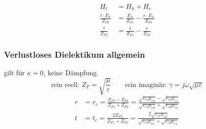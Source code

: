 %

\begin{align*}
    H_t                         & = H_h + H_r                                          \\
    \frac{t\cdot E_{h}}{Z_{F2}} & = \frac{E_{h}}{Z_{F1}} - \frac{r\cdot E_{h}}{Z_{F1}} \\
    \frac{t}{Z_{F2}}            & = \frac{1}{Z_{F1}} - \frac{r}{Z_{F1}}
\end{align*}




\subsubsection[Senkrechter Einfall ideales/verlustl. Dielekt.]{Verlustloses Dielektikum allgemein}
gilt für $ \kappa =0 $, keine Dämpfung.
\vspace{-0.3cm}
\[ \text{rein reell: }Z_F=  \sqrt{\frac{\mu}{\varepsilon}}  \qquad
\text{rein imaginär: }\gamma  = j \omega\sqrt{\mu\varepsilon} \]
\vspace{-0.5cm}
\begin{align*}
    r & = r_e =\frac{Z_{F2} - Z_{F1}}{Z_{F1} + Z_{F2}} = \frac{\sqrt{\varepsilon_{r1}\mu_{r2}} - \sqrt{\varepsilon_{r2}\mu_{r1}} }{\sqrt{\varepsilon_{r1}\mu_{r2}}+{\sqrt{\varepsilon_{r2}\mu_{r1}}}} \\
    t & = t_e = \frac{2 Z_{F2}}{Z_{F1} + Z_{F2}} = \frac{2\sqrt{\varepsilon_{r1}\mu_{r2}}}{\sqrt{\varepsilon_{r1}\mu_{r2}}+\sqrt{\varepsilon_{r2}\mu_{r1}}}
\end{align*}

